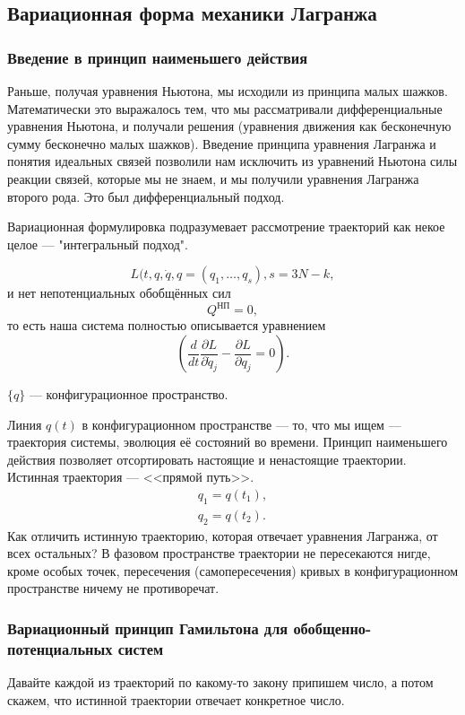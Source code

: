 \subsection{Вариационная форма механики Лагранжа}
\subsubsection{Введение в принцип наименьшего действия}
Раньше, получая уравнения Ньютона, мы исходили из принципа малых шажков. Математически это выражалось тем, что мы рассматривали дифференциальные уравнения Ньютона, и получали решения (уравнения движения как бесконечную сумму бесконечно малых шажков). Введение принципа уравнения Лагранжа и понятия идеальных связей позволили нам исключить из уравнений Ньютона силы реакции связей, которые мы не знаем, и мы получили уравнения Лагранжа второго рода. Это был дифференциальный подход.

Вариационная формулировка подразумевает рассмотрение траекторий как некое целое --- "интегральный подход".

\[L(t, q, \dot{q}, q = (q_1, \dots, q_s), s= 3N-k,\]
и нет непотенциальных обобщённых сил
\[Q^{\text{НП}} =0, \]
то есть наша система полностью описывается уравнением
\[\left(\frac{d}{d t} \frac{\partial L}{\partial \dot{q}_{j}} - \frac{\partial L}{\partial q_{j}}=0\right).\]
\begin{dfn}
$\{q\}$ --- конфигурационное пространство.
\end{dfn}
Линия $q(t)$ в конфигурационном пространстве --- то, что мы ищем --- траектория системы, эволюция её состояний во времени. Принцип наименьшего действия позволяет отсортировать настоящие и ненастоящие траектории.  Истинная траектория --- <<прямой путь>>.
\begin{gather}
q_1 = q(t_1),\\
q_2 = q(t_2).
\end{gather}
Как отличить истинную траекторию, которая отвечает уравнения Лагранжа, от всех остальных? В фазовом пространстве траектории не пересекаются нигде, кроме особых точек, пересечения (самопересечения) кривых в конфигурационном пространстве ничему не противоречат.

\subsubsection{Вариационный принцип Гамильтона для обобщенно-потенциальных систем}
Давайте каждой из траекторий по какому-то закону припишем число, а потом скажем, что истинной траектории отвечает конкретное число.


